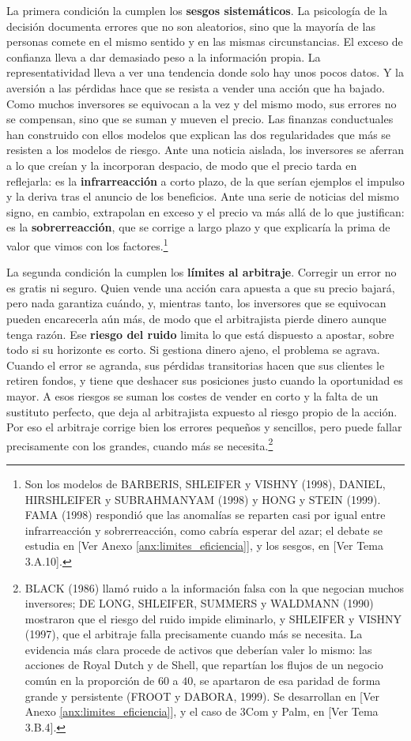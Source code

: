 \documentclass[10pt,a4paper]{article}
\newcommand{\authorfont}[1]{{\fontfamily{EBGaramond-TLF}\selectfont #1}}
\begin{document}
La primera condición la cumplen los \textbf{sesgos sistemáticos}. La psicología de la decisión documenta errores que no son aleatorios, sino que la mayoría de las personas comete en el mismo sentido y en las mismas circunstancias. El exceso de confianza lleva a dar demasiado peso a la información propia. La representatividad lleva a ver una tendencia donde solo hay unos pocos datos. Y la aversión a las pérdidas hace que se resista a vender una acción que ha bajado. Como muchos inversores se equivocan a la vez y del mismo modo, sus errores no se compensan, sino que se suman y mueven el precio. Las finanzas conductuales han construido con ellos modelos que explican las dos regularidades que más se resisten a los modelos de riesgo. Ante una noticia aislada, los inversores se aferran a lo que creían y la incorporan despacio, de modo que el precio tarda en reflejarla: es la \textbf{infrarreacción} a corto plazo, de la que serían ejemplos el impulso y la deriva tras el anuncio de los beneficios. Ante una serie de noticias del mismo signo, en cambio, extrapolan en exceso y el precio va más allá de lo que justifican: es la \textbf{sobrerreacción}, que se corrige a largo plazo y que explicaría la prima de valor que vimos con los factores.\footnote{%
    Son los modelos de BARBERIS, SHLEIFER y VISHNY (1998), DANIEL, HIRSHLEIFER y SUBRAHMANYAM (1998) y HONG y STEIN (1999). FAMA (1998) respondió que las anomalías se reparten casi por igual entre infrarreacción y sobrerreacción, como cabría esperar del azar; el debate se estudia en [\authorfont{Ver Anexo \ref{anx:limites_eficiencia}}], y los sesgos, en [\authorfont{Ver Tema 3.A.10}].
}

La segunda condición la cumplen los \textbf{límites al arbitraje}. Corregir un error no es gratis ni seguro. Quien vende una acción cara apuesta a que su precio bajará, pero nada garantiza cuándo, y, mientras tanto, los inversores que se equivocan pueden encarecerla aún más, de modo que el arbitrajista pierde dinero aunque tenga razón. Ese \textbf{riesgo del ruido} limita lo que está dispuesto a apostar, sobre todo si su horizonte es corto. Si gestiona dinero ajeno, el problema se agrava. Cuando el error se agranda, sus pérdidas transitorias hacen que sus clientes le retiren fondos, y tiene que deshacer sus posiciones justo cuando la oportunidad es mayor. A esos riesgos se suman los costes de vender en corto y la falta de un sustituto perfecto, que deja al arbitrajista expuesto al riesgo propio de la acción. Por eso el arbitraje corrige bien los errores pequeños y sencillos, pero puede fallar precisamente con los grandes, cuando más se necesita.\footnote{%
    BLACK (1986) llamó ruido a la información falsa con la que negocian muchos inversores; DE LONG, SHLEIFER, SUMMERS y WALDMANN (1990) mostraron que el riesgo del ruido impide eliminarlo, y SHLEIFER y VISHNY (1997), que el arbitraje falla precisamente cuando más se necesita. La evidencia más clara procede de activos que deberían valer lo mismo: las acciones de Royal Dutch y de Shell, que repartían los flujos de un negocio común en la proporción de $60$ a $40$, se apartaron de esa paridad de forma grande y persistente (FROOT y DABORA, 1999). Se desarrollan en [\authorfont{Ver Anexo \ref{anx:limites_eficiencia}}], y el caso de 3Com y Palm, en [\authorfont{Ver Tema 3.B.4}].
}
\end{document}
